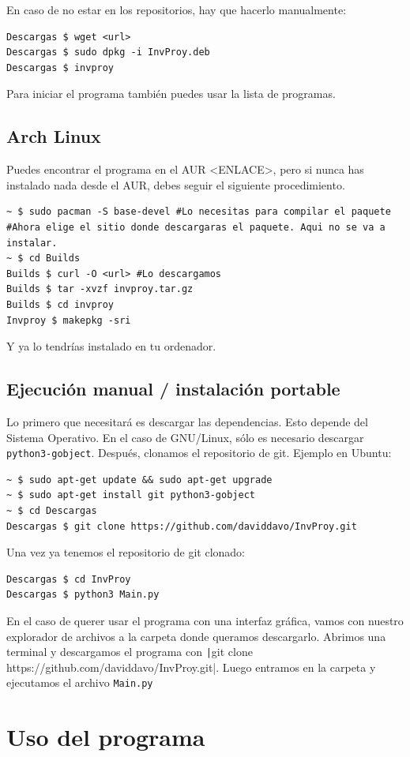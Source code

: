 \documentclass[a4paper, 11pt]{report} %
\begin{document}
En caso de no estar en los repositorios, hay que hacerlo manualmente:
\begin{verbatim}
Descargas $ wget <url>
Descargas $ sudo dpkg -i InvProy.deb
Descargas $ invproy
\end{verbatim}
Para iniciar el programa también puedes usar la lista de programas.

\subsection{Arch Linux}
Puedes encontrar el programa en el AUR <ENLACE>, pero si nunca has instalado nada desde el AUR, debes seguir el siguiente procedimiento.
\begin{verbatim}
~ $ sudo pacman -S base-devel #Lo necesitas para compilar el paquete
#Ahora elige el sitio donde descargaras el paquete. Aqui no se va a instalar.
~ $ cd Builds
Builds $ curl -O <url> #Lo descargamos
Builds $ tar -xvzf invproy.tar.gz
Builds $ cd invproy
Invproy $ makepkg -sri
\end{verbatim}

Y ya lo tendrías instalado en tu ordenador.

\subsection{Ejecución manual / instalación portable}
Lo primero que necesitará es descargar las dependencias. Esto depende del Sistema Operativo. En el caso de GNU/Linux, sólo es necesario descargar \texttt{python3-gobject}. Después, clonamos el repositorio de git. Ejemplo en Ubuntu:
\begin{verbatim}
~ $ sudo apt-get update && sudo apt-get upgrade
~ $ sudo apt-get install git python3-gobject
~ $ cd Descargas
Descargas $ git clone https://github.com/daviddavo/InvProy.git
\end{verbatim}

\noindent Una vez ya tenemos el repositorio de git clonado:
\begin{verbatim}
Descargas $ cd InvProy
Descargas $ python3 Main.py
\end{verbatim}

En el caso de querer usar el programa con una interfaz gráfica, vamos con nuestro explorador de archivos a la carpeta donde queramos descargarlo. Abrimos una terminal y descargamos el programa con \texttt|git clone https://github.com/daviddavo/InvProy.git|. Luego entramos en la carpeta y ejecutamos el archivo \texttt{Main.py}
\section{Uso del programa}
\end{document}
